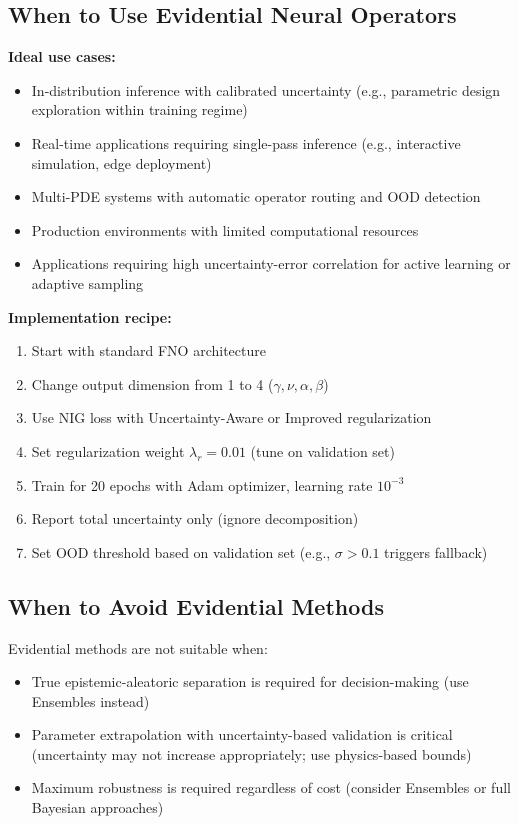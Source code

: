 \subsection{When to Use Evidential Neural Operators}

\textbf{Ideal use cases:}
\begin{itemize}
\item In-distribution inference with calibrated uncertainty (e.g., parametric design exploration within training regime)
\item Real-time applications requiring single-pass inference (e.g., interactive simulation, edge deployment)
\item Multi-PDE systems with automatic operator routing and OOD detection
\item Production environments with limited computational resources
\item Applications requiring high uncertainty-error correlation for active learning or adaptive sampling
\end{itemize}

\textbf{Implementation recipe:}
\begin{enumerate}
\item Start with standard FNO architecture
\item Change output dimension from 1 to 4 ($\gamma, \nu, \alpha, \beta$)
\item Use NIG loss with Uncertainty-Aware or Improved regularization
\item Set regularization weight $\lambda_r = 0.01$ (tune on validation set)
\item Train for 20 epochs with Adam optimizer, learning rate $10^{-3}$
\item Report total uncertainty only (ignore decomposition)
\item Set OOD threshold based on validation set (e.g., $\sigma > 0.1$ triggers fallback)
\end{enumerate}

\subsection{When to Avoid Evidential Methods}

Evidential methods are not suitable when:
\begin{itemize}
\item True epistemic-aleatoric separation is required for decision-making (use Ensembles instead)
\item Parameter extrapolation with uncertainty-based validation is critical (uncertainty may not increase appropriately; use physics-based bounds)
\item Maximum robustness is required regardless of cost (consider Ensembles or full Bayesian approaches)
\end{itemize}

